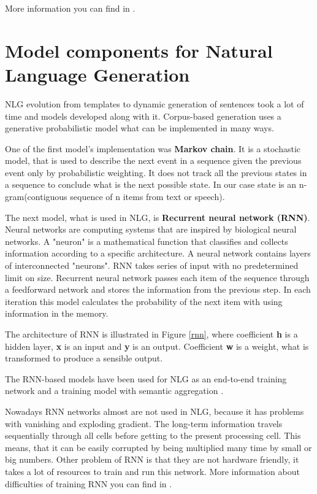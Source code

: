 More information you can find in \cite{stochastic_language_generation_ds} \cite{survey_on_ds} \cite{data_driven_nlg}.

\section{Model components for Natural Language Generation}
NLG evolution from templates to dynamic generation of sentences took a lot of time and models developed along with it. Corpus-based generation uses a generative probabilistic model what can be implemented in many ways.

One of the first model's implementation was \textbf{Markov chain}. It is a stochastic model, that is used to describe the next event in a sequence given the previous event only by probabilistic weighting. It does not track all the previous states in a sequence to conclude what is the next possible state. In our case state is an n-gram(contiguous sequence of n items from text or speech).

The next model, what is used in NLG, is \textbf{Recurrent neural network (RNN)}. Neural networks are computing systems that are inspired by biological neural networks. A "neuron" is a mathematical function that classifies and collects information according to a specific architecture. A neural network contains layers of interconnected "neurons". RNN takes series of input with no predetermined limit on size. Recurrent neural network passes each item of the sequence through a feedforward network and stores the information from the previous step. In each iteration this model calculates the probability of the next item with using information in the memory.

The architecture of RNN is illustrated in Figure \ref{rnn}, where coefficient \textbf{h} is a hidden layer, \textbf{x} is an input and \textbf{y} is an output. Coefficient \textbf{w} is a weight, what is transformed to produce a sensible output.

The RNN-based models have been used for NLG as an end-to-end training network \cite{network_nlg} and a training model with semantic aggregation \cite{rnn_nlg}. 

Nowadays RNN networks almost are not used in NLG, because it has problems with vanishing and exploding gradient. The long-term information travels sequentially  through all cells before getting to the present processing cell. This means, that it can be easily corrupted by being multiplied many time by small or big numbers. Other problem of RNN is that they are not hardware friendly, it takes a lot of resources to train and run this network. More information about difficulties of training RNN you can find in \cite{rnn_difficulties}.

